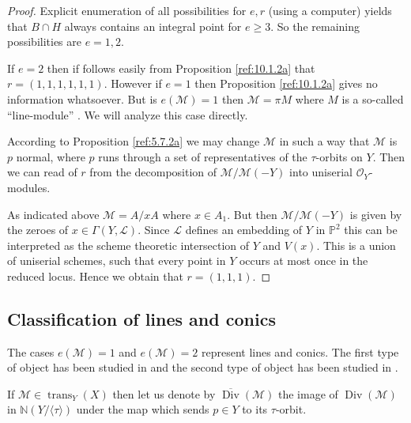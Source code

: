 \documentclass{amsproc}
\def \PP{{\mathbb P}}
\def \NN{{\mathbb N}}
\def\Lscr{{\mathcal L}}
\def\Mscr{{\mathcal M}}
\def\Oscr{{\mathcal O}}
\def\trans{\operatorname{trans}}
\def\Div{\operatorname{Div}}
\theoremstyle{definition}
\theoremstyle{remark}
\numberwithin{equation}{section}
\numberwithin{table}{section}
\numberwithin{figure}{section}
\begin{document}
\begin{proof}
Explicit enumeration of all possibilities for $e,r$ (using a
computer) yields that $B\cap H$ always contains an integral point for
$e\ge 3$. So the remaining possibilities are $e=1,2$.

If $e=2$ then if follows easily from Proposition \ref{ref:10.1.2a}
that $r=(1,1,1,1,1,1)$. However if $e=1$ then Proposition
\ref{ref:10.1.2a} gives no information whatsoever. But is
$e(\Mscr)=1$ then $\Mscr=\pi M$ where $M$ is a so-called
``line-module'' \cite{ATV2}. We will analyze this case directly.

According to Proposition \ref{ref:5.7.2a} we may change
$\Mscr$ in such a way that $\Mscr$ is $p$ normal, where $p$ runs
through a set of representatives of the $\tau$-orbits on $Y$.  Then we
can read of $r$ from the decomposition of $\Mscr/\Mscr(-Y)$ into
uniserial $\Oscr_Y$-modules.

As indicated above $\Mscr=A/xA$ where $x\in A_1$. But then
$\Mscr/\Mscr(-Y)$ is given by the zeroes of $x\in \Gamma(Y,\Lscr)$.
Since $\Lscr$ defines an embedding of $Y$ in $\PP^2$ this can be
interpreted as the scheme theoretic intersection of $Y$ and $V(x)$.
This is a union of uniserial schemes, such that every point in $Y$
occurs at most once in the reduced locus. Hence we obtain that
$r=(1,1,1)$.
\end{proof}
\subsection{Classification of lines and conics}
The cases $e(\Mscr)=1$ and $e(\Mscr)=2$ represent lines and
conics. The first type of object has been studied in \cite{ATV2} and
the second type of object has been studied in  \cite{Ajitabh}. 


If $\Mscr\in \trans_Y(X)$ then let us denote by
$\overline{\Div}(\Mscr)$ the image of $\Div(\Mscr)$ in
$\NN(Y/\langle\tau\rangle)$ under the map which sends $p\in Y$ to its
$\tau$-orbit.  
\end{document}
